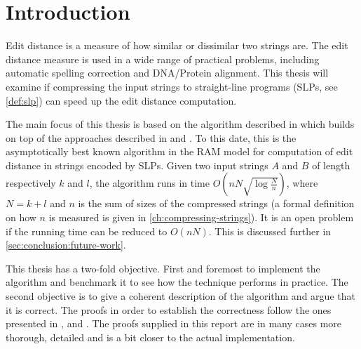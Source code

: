 \documentclass[twoside,11pt,openright]{report}
\newcommand{\todo}[1]{{\color[rgb]{.5,0,0}\textbf{$\blacktriangleright$#1$\blacktriangleleft$}}}
\begin{document}
\endgroup




\tableofcontents
\clearpage
{}
\setcounter{secnumdepth}{2}


\chapter{Introduction}
\label{ch:intro}
Edit distance is a measure of how similar or dissimilar two strings are. The edit distance measure is used in a wide range of practical problems, including automatic spelling correction and DNA/Protein alignment. This thesis will examine if compressing the input strings to straight-line programs (SLPs, see \cref{def:slp}) can speed up the edit distance computation.

The main focus of this thesis is based on the algorithm described in \cite{Gawrychowski:2012:FAC:2422024.2422048} which builds on top of the approaches described in \cite{DBLP:journals/corr/abs-1004-1194} and \cite{DBLP:journals/corr/abs-0707-3619}. To this date, this is the asymptotically best known algorithm in the RAM model for computation of edit distance in strings encoded by SLPs. Given two input strings $A$ and $B$ of length respectively $k$ and $l$, the algorithm runs in time $O(n N \sqrt{\log{\frac{N}{n}}})$, where $N = k + l$ and $n$ is the sum of sizes of the compressed strings (a formal definition on how $n$ is measured is given in \cref{ch:compressing-strings}). It is an open problem if the running time can be reduced to $O(nN)$. This is discussed further in \cref{sec:conclusion:future-work}.

This thesis has a two-fold objective. First and foremost to implement the algorithm and benchmark it to see how the technique performs in practice. The second objective is to give a coherent description of the algorithm and argue that it is correct. The proofs in order to establish the correctness follow the ones presented in \cite{DBLP:journals/corr/abs-0707-3619}, \cite{Gawrychowski:2012:FAC:2422024.2422048} and \cite{Tiskin:2010:FDM:1873601.1873704}. The proofs supplied in this report are in many cases more thorough, detailed and is a bit closer to the actual implementation.
\end{document}
